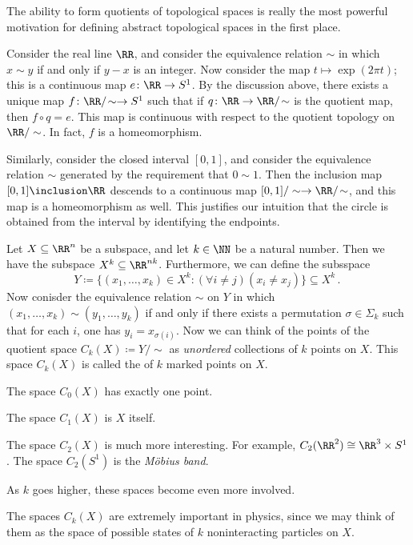 The ability to form quotients of topological spaces is really the most powerful motivation for defining abstract topological spaces in the first place.

\begin{exm}
	Consider the real line $\RR$, and consider the equivalence relation $\sim$ in which $x \sim y $ if and only if $y-x$ is an integer.
	Now consider the map $t \mapsto \exp(2\pi t)$; this is a continuous map $e \colon \RR \to S^1$.
	By the discussion above, there exists a unique map $ f \colon \RR/\!\sim \to S^1$ such that if $q \colon \RR \to \RR/\!\sim $ is the quotient map, then $f \circ q = e$.
	This map is continuous with respect to the quotient topology on $\RR/\sim$.
	In fact, $f$ is a homeomorphism.

	Similarly, consider the closed interval $[0,1]$, and consider the equivalence relation $\sim$ generated by the requirement that $0\sim 1$.
	Then the inclusion map $[0,1] \inclusion \RR$ descends to a continuous map $[0,1]/\sim \to \RR/\!\sim$, and this map is a homeomorphism as well.
	This justifies our intuition that the circle is obtained from the interval by identifying the endpoints.
\end{exm}

\begin{exm}
	Let $X \subseteq \RR^n$ be a subspace, and let $k \in \NN$ be a natural number.
	Then we have the subspace $X^k \subseteq \RR^{nk}$.
	Furthermore, we can define the subsspace
	\[
		Y \coloneq \{(x_1,\dots,x_k) \in X^k : (\forall i \neq j)(x_i \neq x_j) \} \subseteq X^k \period
	\]
	Now conisder the equivalence relation $\sim$ on $Y$ in which $(x_1, \dots, x_k) \sim (y_1,\dots, y_k)$ if and only if there exists a permutation%
	$\sigma \in \Sigma_k$ such that for each $i$, one has $y_i = x_{\sigma(i)}$.
	Now we can think of the points of the quotient space $C_k(X) \coloneq Y/\!\sim$ as \emph{unordered} collections of $k$ points on $X$.
	This space $C_k(X)$ is called the  of $k$ marked points on $X$.

	The space $C_0(X)$ has exactly one point.

	The space $C_1(X)$ is $X$ itself.

	The space $C_2(X)$ is much more interesting.
	For example, $C_2(\RR^2) \cong \RR^3 \times S^1$.
	The space $C_2(S^1)$ is the \emph{M\"obius band}.

	As $k$ goes higher, these spaces become even more involved.

	The spaces $C_k(X)$ are extremely important in physics, since we may think of them as the space of possible states of $k$ noninteracting particles on $X$.
\end{exm}

